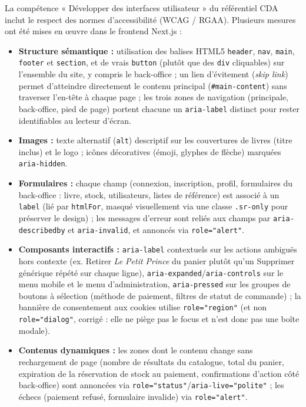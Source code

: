 \documentclass[12pt, a4paper]{report}
\renewcommand{\_}{\origunderscore\allowbreak}
\begin{document}
La compétence « Développer des interfaces utilisateur » du référentiel CDA inclut le respect des normes d'accessibilité (WCAG / RGAA). Plusieurs mesures ont été mises en œuvre dans le frontend Next.js :

\begin{itemize}
    \item \textbf{Structure sémantique :} utilisation des balises HTML5 \texttt{header}, \texttt{nav}, \texttt{main}, \texttt{footer} et \texttt{section}, et de vrais \texttt{button} (plutôt que des \texttt{div} cliquables) sur l'ensemble du site, y compris le back-office ; un lien d'évitement (\textit{skip link}) permet d'atteindre directement le contenu principal (\texttt{\#main-content}) sans traverser l'en-tête à chaque page ; les trois zones de navigation (principale, back-office, pied de page) portent chacune un \texttt{aria-label} distinct pour rester identifiables au lecteur d'écran.
    \item \textbf{Images :} texte alternatif (\texttt{alt}) descriptif sur les couvertures de livres (titre inclus) et le logo ; icônes décoratives (émoji, glyphes de flèche) marquées \texttt{aria-hidden}.
    \item \textbf{Formulaires :} chaque champ (connexion, inscription, profil, formulaires du back-office : livre, stock, utilisateurs, listes de référence) est associé à un \texttt{label} (lié par \texttt{htmlFor}, masqué visuellement via une classe \texttt{.sr-only} pour préserver le design) ; les messages d'erreur sont reliés aux champs par \texttt{aria-describedby} et \texttt{aria-invalid}, et annoncés via \texttt{role="alert"}.
    \item \textbf{Composants interactifs :} \texttt{aria-label} contextuels sur les actions ambiguës hors contexte (ex. \og Retirer \emph{Le Petit Prince} du panier \fg{} plutôt qu'un \og Supprimer \fg{} générique répété sur chaque ligne), \texttt{aria-expanded}/\texttt{aria-controls} sur le menu mobile et le menu d'administration, \texttt{aria-pressed} sur les groupes de boutons à sélection (méthode de paiement, filtres de statut de commande) ; la bannière de consentement aux cookies utilise \texttt{role="region"} (et non \texttt{role="dialog"}, corrigé : elle ne piège pas le focus et n'est donc pas une boîte modale).
    \item \textbf{Contenus dynamiques :} les zones dont le contenu change sans rechargement de page (nombre de résultats du catalogue, total du panier, expiration de la réservation de stock au paiement, confirmations d'action côté back-office) sont annoncées via \texttt{role="status"}/\texttt{aria-live="polite"} ; les échecs (paiement refusé, formulaire invalide) via \texttt{role="alert"}.

\end{itemize}
\end{document}
